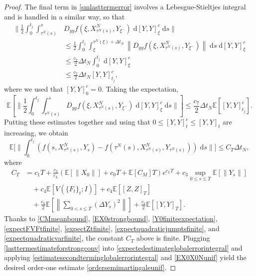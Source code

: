 \documentclass[reqno,12pt]{amsart}
\theoremstyle{plain} %
\theoremstyle{definition} %
\begin{document}
\begin{proof}
    The final term in \eqref{smlasttermerror} involves a Lebesgue-Stieltjes integral and is handled in a similar way, so that
    \begin{align*}
        \bigg\|\frac{1}{2} \int_0^{t_j} \int_{\tau^N(s)}^s & D_{yy}f(\xi, X_{\tau^N(s)}^N, Y_{\xi^-})\;\mathrm{d}[Y, Y]_\xi^c\;\mathrm{d}s \bigg\| \\
        & \leq \frac{1}{2} \int_0^{t_j} \int_{\xi}^{\tau^N(\xi) + \Delta t_N} \left\|D_{yy}f(\xi, X_{\tau^N(s)}^N, Y_{\xi^-})\right\|\;\mathrm{d}s\;\mathrm{d}[Y, Y]_\xi^c \\
        & \leq \frac{c_7}{2}\Delta t_N\int_0^{t_j} \;\mathrm{d}[Y, Y]_\xi^c \\ 
        & \leq \frac{c_7}{2}\Delta t_N [Y, Y]_{t_j}^c,
    \end{align*}
    where we used that $[Y, Y]_0^c = 0.$ Taking the expectation,
    \[
        \mathbb{E}\left[\bigg\|\frac{1}{2} \int_0^{t_j} \int_{\tau^N(s)}^s D_{yy}f(\xi, X_{\tau^N(s)}^N, Y_{\xi^-})\;\mathrm{d}[Y, Y]_\xi^c\;\mathrm{d}s \bigg\|\right] \leq \frac{c_7}{2}\Delta t_N \mathbb{E}\left[[Y, Y]_{t_j}^c\right].
    \]
    Putting these estimates together and using that $0 \leq [Y, Y]_t^c \leq [Y, Y]_t$ are increasing, we obtain
    \begin{equation}
        \label{lasttermestimateforstrongconv}
        \mathbb{E}\bigg[\bigg\| \int_0^{t_j} \left( f(s, X_{\tau^N(s)}^N, Y_s) - f(\tau^N(s), X_{\tau^N(s)}^N, Y_{\tau^N(s)}) \right)\;\mathrm{d}s \bigg\|\bigg] \leq C_T \Delta t_N,
    \end{equation}
    where
    \begin{equation*}
        \begin{aligned}
            C_T & = c_1 T + \frac{c_2}{c_L} \left(\mathbb{E}\left[\|X_0\|\right] + c_0 T + \mathbb{E}[C_M] T \right) e^{c_L T} + c_3\sup_{0 \leq s \leq T}\mathbb{E}\left[\|Y_s\|\right] \\
            & \quad + c_4\mathbb{E}\left[ V(\{F_t\}_t; I) \right] + c_4\mathbb{E}\left[ [Z, Z]_T\right] \\
            & \quad + \frac{c_7}{2} \mathbb{E}\left[\left\|\sum_{0 < s \leq T}\left( \Delta Y_s \right)^2\right\|\right] + \frac{c_7}{2} \mathbb{E}\left[[Y, Y]_T\right].
        \end{aligned}
    \end{equation*}
    Thanks to \eqref{CMmeanbound}, \eqref{EX0strongbound}, \eqref{Y0finiteexpectation}, \eqref{expectFVFtfinite}, \eqref{expectZtfinite}, \eqref{expectquadraticjumptsfinite}, and \eqref{expectquadraticvarfinite}, the constant $C_T$ above is finite. Plugging \eqref{lasttermestimateforstrongconv} into \eqref{expectedestimateglobalerrorintegral} and applying \eqref{estimatesecondterminglobalerrorintegral} and \eqref{EX0X0Nunif} yield the desired order-one estimate \eqref{ordersemimartingaleunif}.
\end{proof}
\end{document}
